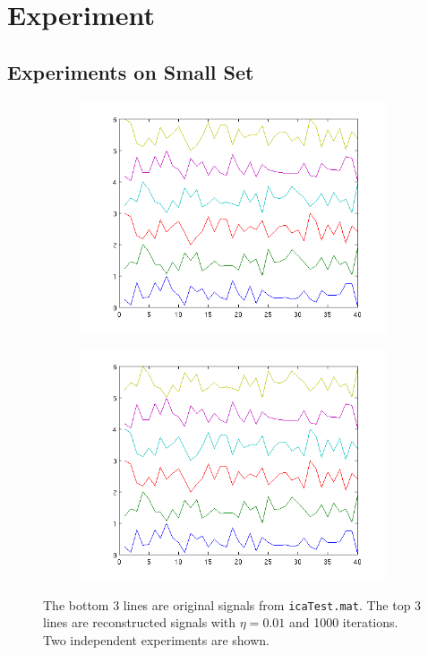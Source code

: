 \documentclass[10pt]{article}
\begin{document}
\section{Experiment}

\subsection{Experiments on Small Set}

\begin{figure}[h]
\centering
\begin{subfigure}{0.49\textwidth}
	\includegraphics[width=\textwidth]{rep5.png}
\end{subfigure}
\begin{subfigure}{0.49\textwidth}
	\includegraphics[width=\textwidth]{rep6.png}
\end{subfigure}
\caption{The bottom 3 lines are original signals from
\texttt{icaTest.mat}. The top 3 lines are reconstructed signals with $\eta
= 0.01$ and 1000 iterations. Two independent experiments are shown.}
\label{fig:rep}
\end{figure}
\end{document}
